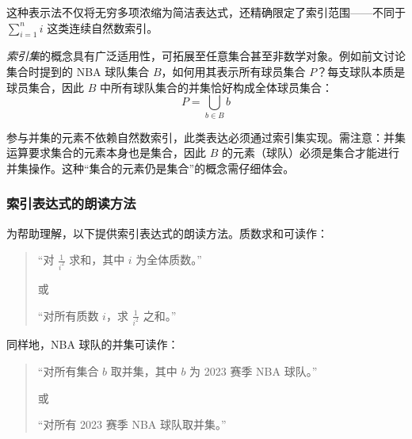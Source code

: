 这种表示法不仅将无穷多项浓缩为简洁表达式，还精确限定了索引范围——不同于 $\sum_{i=1}^{n}i$ 这类连续自然数索引。

\begin{example}
    \emph{索引集}的概念具有广泛适用性，可拓展至任意集合甚至非数学对象。例如前文讨论集合时提到的 NBA 球队集合 $B$，如何用其表示所有球员集合 $P$？每支球队本质是球员集合，因此 $B$ 中所有球队集合的并集恰好构成全体球员集合：
    \[P = \bigcup_{b \in B} b\]

    参与并集的元素不依赖自然数索引，此类表达必须通过索引集实现。需注意：并集运算要求集合的元素本身也是集合，因此 $B$ 的元素（球队）必须是集合才能进行并集操作。这种``集合的元素仍是集合''的概念需仔细体会。
\end{example}

\subsubsection*{索引表达式的朗读方法}

为帮助理解，以下提供索引表达式的朗读方法。质数求和可读作：
\begin{quotation}
    ``对 $\frac{1}{i^2}$ 求和，其中 $i$ 为全体质数。'' 

    或

    ``对所有质数 $i$，求 $\frac{1}{i^2}$ 之和。'' 
\end{quotation}

同样地，NBA 球队的并集可读作：
\begin{quotation}
    ``对所有集合 $b$ 取并集，其中 $b$ 为 2023 赛季 NBA 球队。'' 

    或
    
    ``对所有 2023 赛季 NBA 球队取并集。'' 
\end{quotation}

\clearpage
